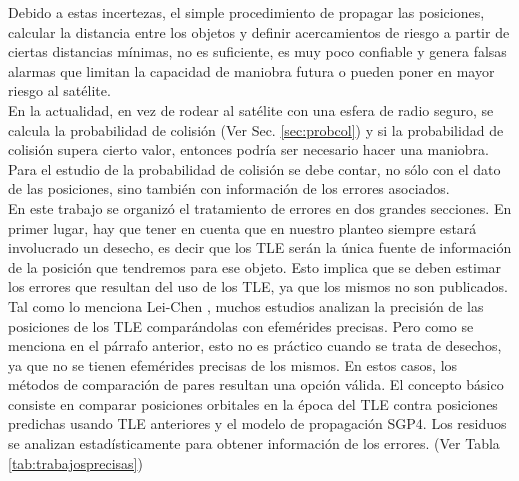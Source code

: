 Debido a estas incertezas, el simple procedimiento de propagar las posiciones, calcular la distancia entre los objetos y definir acercamientos de riesgo a partir de ciertas distancias m\'inimas, no es suficiente, es muy poco confiable y genera falsas alarmas que limitan la capacidad de maniobra futura o pueden poner en mayor riesgo al sat\'elite.\\

En la actualidad, en vez de rodear al sat\'elite con una esfera de radio seguro, se calcula la probabilidad de colisi\'on (Ver Sec. \ref{sec:probcol}) y si la probabilidad de colisi\'on supera cierto valor, entonces podr\'ia ser necesario hacer una maniobra. Para el estudio de la probabilidad de colisi\'on se debe contar, no s\'olo con el dato de las posiciones, sino tambi\'en con informaci\'on de los errores asociados.\\

En este trabajo se organiz\'o el tratamiento de errores en dos grandes secciones. En primer lugar, hay que tener en cuenta que en nuestro planteo siempre estar\'a involucrado un desecho, es decir que los TLE ser\'an la \'unica fuente de informaci\'on de la posici\'on que tendremos para ese objeto. Esto implica que se deben estimar los errores que resultan del uso de los TLE, ya que los mismos no son publicados.\\

Tal como lo menciona Lei-Chen \citep{leichen}, muchos estudios analizan la precisi\'on de las posiciones de los TLE compar\'andolas con efem\'erides precisas. Pero como se menciona en el p\'arrafo anterior, esto no es pr\'actico cuando se trata de desechos, ya que no se tienen efem\'erides precisas de los mismos. En estos casos, los m\'etodos de comparaci\'on de pares resultan una opci\'on v\'alida. El concepto b\'asico consiste en comparar posiciones orbitales en la \'epoca del TLE contra posiciones predichas usando TLE anteriores y el modelo de propagaci\'on SGP4. Los residuos se analizan estad\'isticamente para obtener informaci\'on de los errores. (Ver Tabla \ref{tab:trabajosprecisas})\\

